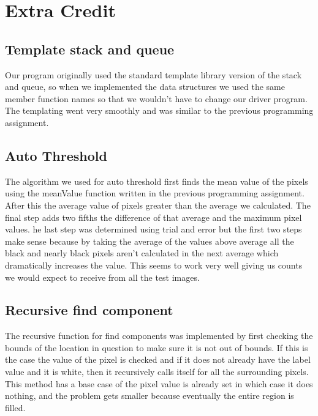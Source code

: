 \documentclass[pdftex, 11pt]{article}
\begin{document}
\section{Extra Credit}

	\subsection{Template stack and queue}

		Our program originally used the standard template library version of the stack and queue, so when we implemented
		the data structures we used the same member function names so that we wouldn't have to change our driver
		program.  The templating went very smoothly and was similar to the previous programming assignment.

	\subsection{Auto Threshold}
		
		The algorithm we used for auto threshold first finds the mean value of the pixels using the meanValue function
		written in the previous programming assignment.  After this the average value of pixels greater than the average
		we calculated.  The final step adds two fifths the difference of that average and the maximum pixel values.
		he last step was determined using trial and error but the first two steps make sense because by taking the
		average of the values above average all the black and nearly black pixels aren't calculated in the next average
		which dramatically increases the value.  This seems to work very well giving us counts we would expect to
		receive from all the test images.
	
	\subsection{Recursive find component}

		The recursive function for find components was implemented by first checking the bounds of the location in
		question to make sure it is not out of bounds.  If this is the case the value of the pixel is checked and if it
		does not already have the label value and it is white, then it recursively calls itself for all the surrounding
		pixels.  This method has a base case of the pixel value is already set in which case it does nothing, and the
		problem gets smaller because eventually the entire region is filled.
\end{document}
